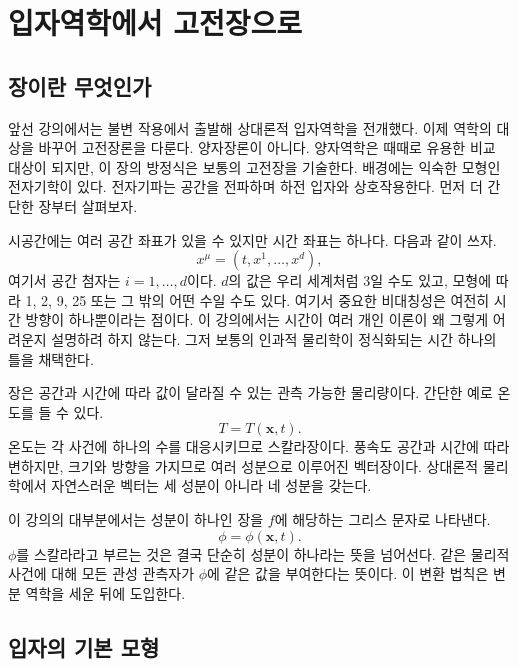 \chapter{입자역학에서 고전장으로}

\section{장이란 무엇인가}

앞선 강의에서는 불변 작용에서 출발해 상대론적 입자역학을 전개했다. 이제 역학의 대상을 바꾸어 고전장론을 다룬다. 양자장론이 아니다. 양자역학은 때때로 유용한 비교 대상이 되지만, 이 장의 방정식은 보통의 고전장을 기술한다. 배경에는 익숙한 모형인 전자기학이 있다. 전자기파는 공간을 전파하며 하전 입자와 상호작용한다. 먼저 더 간단한 장부터 살펴보자.

시공간에는 여러 공간 좌표가 있을 수 있지만 시간 좌표는 하나다. 다음과 같이 쓰자.
\begin{equation}
x^\mu=(t,x^1,\ldots,x^d),
\end{equation}
여기서 공간 첨자는 \(i=1,\ldots,d\)이다. \(d\)의 값은 우리 세계처럼 3일 수도 있고, 모형에 따라 1, 2, 9, 25 또는 그 밖의 어떤 수일 수도 있다. 여기서 중요한 비대칭성은 여전히 시간 방향이 하나뿐이라는 점이다. 이 강의에서는 시간이 여러 개인 이론이 왜 그렇게 어려운지 설명하려 하지 않는다. 그저 보통의 인과적 물리학이 정식화되는 시간 하나의 틀을 채택한다.

장은 공간과 시간에 따라 값이 달라질 수 있는 관측 가능한 물리량이다. 간단한 예로 온도를 들 수 있다.
\begin{equation}
T=T(\mathbf{x},t).
\end{equation}
온도는 각 사건에 하나의 수를 대응시키므로 스칼라장이다. 풍속도 공간과 시간에 따라 변하지만, 크기와 방향을 가지므로 여러 성분으로 이루어진 벡터장이다. 상대론적 물리학에서 자연스러운 벡터는 세 성분이 아니라 네 성분을 갖는다.

이 강의의 대부분에서는 성분이 하나인 장을 \(f\)에 해당하는 그리스 문자로 나타낸다.
\begin{equation}
\phi=\phi(\mathbf{x},t).
\label{eq:sr4-field-definition}
\end{equation}
\(\phi\)를 스칼라라고 부르는 것은 결국 단순히 성분이 하나라는 뜻을 넘어선다. 같은 물리적 사건에 대해 모든 관성 관측자가 \(\phi\)에 같은 값을 부여한다는 뜻이다. 이 변환 법칙은 변분 역학을 세운 뒤에 도입한다.

\section{입자의 기본 모형}

